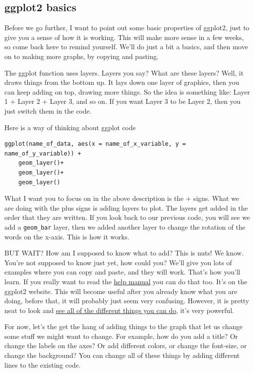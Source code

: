 \documentclass[]{book}
\begin{document}
\subsection{ggplot2 basics}\label{ggplot2-basics}

Before we go further, I want to point out some basic properties of
ggplot2, just to give you a sense of how it is working. This will make
more sense in a few weeks, so come back here to remind yourself. We'll
do just a bit a basics, and then move on to making more graphs, by
copying and pasting.

The ggplot function uses layers. Layers you say? What are these layers?
Well, it draws things from the bottom up. It lays down one layer of
graphics, then you can keep adding on top, drawing more things. So the
idea is something like: Layer 1 + Layer 2 + Layer 3, and so on. If you
want Layer 3 to be Layer 2, then you just switch them in the code.

Here is a way of thinking about ggplot code

\begin{verbatim}
ggplot(name_of_data, aes(x = name_of_x_variable, y = name_of_y_variable)) +
    geom_layer()+
    geom_layer()+
    geom_layer()
\end{verbatim}

What I want you to focus on in the above description is the \(+\) signs.
What we are doing with the plus signs is adding layers to plot. The
layers get added in the order that they are written. If you look back to
our previous code, you will see we add a \texttt{geom\_bar} layer, then
we added another layer to change the rotation of the words on the
x-axis. This is how it works.

BUT WAIT? How am I supposed to know what to add? This is nuts! We know.
You're not supposed to know just yet, how could you? We'll give you lots
of examples where you can copy and paste, and they will work. That's how
you'll learn. If you really want to read the
\href{https://ggplot2.tidyverse.org/reference/index.html}{help manual}
you can do that too. It's on the ggplot2 website. This will become
useful after you already know what you are doing, before that, it will
probably just seem very confusing. However, it is pretty neat to look
and \href{http://www.ggplot2-exts.org/gallery/}{see all of the different
things you can do}, it's very powerful.

For now, let's the get the hang of adding things to the graph that let
us change some stuff we might want to change. For example, how do you
add a title? Or change the labels on the axes? Or add different colors,
or change the font-size, or change the background? You can change all of
these things by adding different lines to the existing code.
\end{document}
